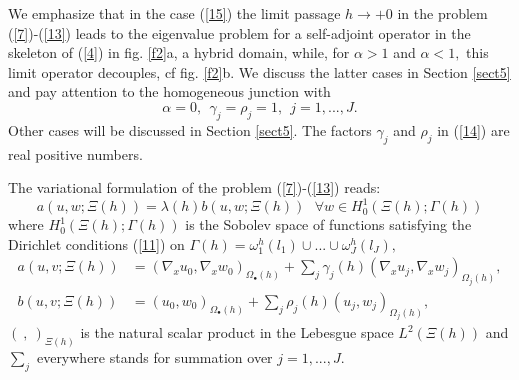 \documentclass[11pt]{article}%
\numberwithin{equation}{section}
\begin{document}
We emphasize that in the case (\ref{15}) the limit passage $h\rightarrow+0$ in
the problem (\ref{7})-(\ref{13}) leads to the eigenvalue problem for a
self-adjoint operator in the skeleton of (\ref{4}) in fig. \ref{f2}a, a
hybrid domain, while, for $\alpha>1$ and $\alpha<1,$ this limit operator
decouples, cf fig. \ref{f2}b. We discuss the latter cases in Section
\ref{sect5} and pay attention to the homogeneous junction with
\begin{equation}
\alpha=0,\ \ \gamma_{j}=\rho_{j}=1,\ \ j=1,...,J. \label{82}%
\end{equation}
Other cases will be discussed in Section \ref{sect5}. The factors $\gamma_{j}$
and $\rho_{j}$ in (\ref{14}) are real positive numbers.

The variational formulation of the problem (\ref{7})-(\ref{13}) reads:%
\begin{equation}
a\left(  u,w;\Xi\left(  h\right)  \right)  =\lambda(h)b\left(  u,w;\Xi\left(
h\right)  \right)  \ \ \ \forall w\in H_{0}^{1}\left(  \Xi\left(  h\right)
;\Gamma\left(  h\right)  \right)  \label{16}%
\end{equation}
where $H_{0}^{1}\left(  \Xi\left(  h\right)  ;\Gamma\left(  h\right)  \right)
$ is the Sobolev space of functions satisfying the Dirichlet conditions
(\ref{11}) on $\Gamma\left(  h\right)  =\omega_{1}^{h}\left(  l_{1}\right)
\cup...\cup\omega_{J}^{h}\left(  l_{J}\right)  ,$%
\begin{align}
a\left(  u,v;\Xi\left(  h\right)  \right)   &  =\left(  \nabla_{x}u_{0}%
,\nabla_{x}w_{0}\right)  _{\Omega_{\bullet}\left(  h\right)  }+\sum
\nolimits_{j}\gamma_{j}\left(  h\right)  \left(  \nabla_{x}u_{j},\nabla
_{x}w_{j}\right)  _{\Omega_{j}\left(  h\right)  },\label{17}\\
b\left(  u,v;\Xi\left(  h\right)  \right)   &  =\left(  u_{0},w_{0}\right)
_{\Omega_{\bullet}\left(  h\right)  }+\sum\nolimits_{j}\rho_{j}\left(
h\right)  \left(  u_{j},w_{j}\right)  _{\Omega_{j}\left(  h\right)
},\nonumber
\end{align}
$\left(  \ ,\ \right)  _{\Xi\left(  h\right)  }$ is the natural scalar product
in the Lebesgue space $L^{2}\left(  \Xi\left(  h\right)  \right)  $ and
$\sum\nolimits_{j}$ everywhere stands for summation over $j=1,...,J$.
\end{document}
